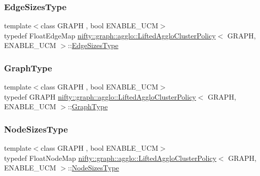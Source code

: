 \subsubsection{\texorpdfstring{Edge\+Sizes\+Type}{EdgeSizesType}}
{\footnotesize\ttfamily template$<$class G\+R\+A\+PH , bool E\+N\+A\+B\+L\+E\+\_\+\+U\+CM$>$ \\
typedef Float\+Edge\+Map \hyperlink{classnifty_1_1graph_1_1agglo_1_1LiftedAggloClusterPolicy}{nifty\+::graph\+::agglo\+::\+Lifted\+Agglo\+Cluster\+Policy}$<$ G\+R\+A\+PH, E\+N\+A\+B\+L\+E\+\_\+\+U\+CM $>$\+::\hyperlink{classnifty_1_1graph_1_1agglo_1_1LiftedAggloClusterPolicy_a910399705bc9a60aabb360ac4e9c21d8}{Edge\+Sizes\+Type}}

\mbox{\label{classnifty_1_1graph_1_1agglo_1_1LiftedAggloClusterPolicy_a727d681b2fa133b8c9b225ab11cd2402}} 
\subsubsection{\texorpdfstring{Graph\+Type}{GraphType}}
{\footnotesize\ttfamily template$<$class G\+R\+A\+PH , bool E\+N\+A\+B\+L\+E\+\_\+\+U\+CM$>$ \\
typedef G\+R\+A\+PH \hyperlink{classnifty_1_1graph_1_1agglo_1_1LiftedAggloClusterPolicy}{nifty\+::graph\+::agglo\+::\+Lifted\+Agglo\+Cluster\+Policy}$<$ G\+R\+A\+PH, E\+N\+A\+B\+L\+E\+\_\+\+U\+CM $>$\+::\hyperlink{classnifty_1_1graph_1_1agglo_1_1LiftedAggloClusterPolicy_a727d681b2fa133b8c9b225ab11cd2402}{Graph\+Type}}

\mbox{\label{classnifty_1_1graph_1_1agglo_1_1LiftedAggloClusterPolicy_a2d0fff8850777c3e10a61b3cdb963207}} 
\subsubsection{\texorpdfstring{Node\+Sizes\+Type}{NodeSizesType}}
{\footnotesize\ttfamily template$<$class G\+R\+A\+PH , bool E\+N\+A\+B\+L\+E\+\_\+\+U\+CM$>$ \\
typedef Float\+Node\+Map \hyperlink{classnifty_1_1graph_1_1agglo_1_1LiftedAggloClusterPolicy}{nifty\+::graph\+::agglo\+::\+Lifted\+Agglo\+Cluster\+Policy}$<$ G\+R\+A\+PH, E\+N\+A\+B\+L\+E\+\_\+\+U\+CM $>$\+::\hyperlink{classnifty_1_1graph_1_1agglo_1_1LiftedAggloClusterPolicy_a2d0fff8850777c3e10a61b3cdb963207}{Node\+Sizes\+Type}}



